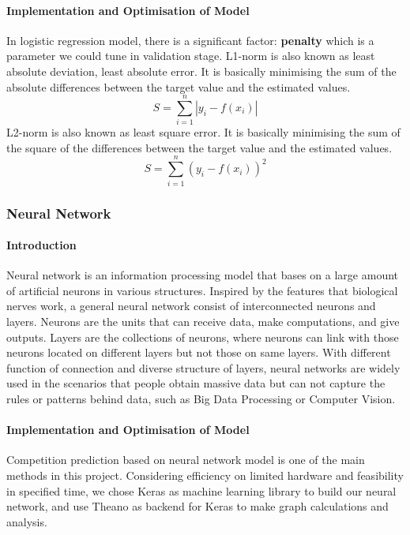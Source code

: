 \documentclass[
10pt, %
a4paper, %
oneside, %
headinclude,footinclude, %
BCOR5mm, %
]{scrartcl}
\begin{document}
\paragraph{Implementation and Optimisation of Model}
In logistic regression model, there is a significant factor: \textbf{penalty} which is a parameter we could tune in validation stage. L1-norm is also known as least absolute deviation, least absolute error. It is basically minimising the sum of the absolute differences between the target value and the estimated values. 
\begin{equation}
S = \sum_{i=1}^{n}\left | y_{i}-f(x_{i}) \right |
\end{equation}
L2-norm is also known as least square error. It is basically minimising the sum of the square of the differences between the target value and the estimated values.
\begin{equation}
S = \sum_{i=1}^{n}\left ( y_{i}-f(x_{i}) \right )^{2}
\end{equation}
\subsubsection{Neural Network}
\paragraph{Introduction}
Neural network is an information processing model that bases on a large amount of artificial neurons in various structures. Inspired by the features that biological nerves work, a general neural network consist of interconnected neurons and layers. Neurons are the units that can receive data, make computations, and give outputs. Layers are the collections of neurons, where neurons can link with those neurons located on different layers but not those on same layers. With different function of connection and diverse structure of layers, neural networks are widely used in the scenarios that people obtain massive data but can not capture the rules or patterns behind data, such as Big Data Processing or Computer Vision.\cite{ann}

\paragraph{Implementation and Optimisation of Model}
Competition prediction based on neural network model is one of the main methods in this project. Considering efficiency on limited hardware and feasibility in specified time, we chose Keras as machine learning library to build our neural network, and use Theano as backend for Keras to make graph calculations and analysis.
\end{document}
